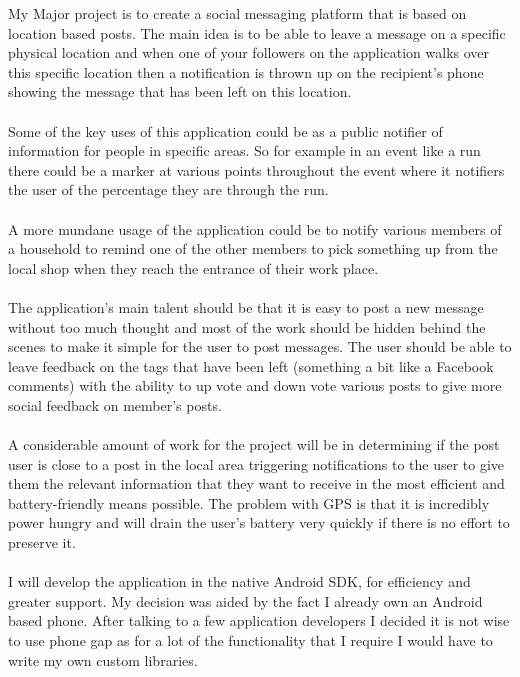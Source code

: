 \documentclass[11pt,fleqn,twoside]{article}
\begin{document}
My Major project is to create a social messaging platform that is based on location based posts. The main idea is to be able to leave a message on a specific physical location and when one of your followers on the application walks over this specific location then a notification is thrown up on the recipient's phone showing the message that has been left on this location. \\
\\
Some of the key uses of this application could be as a public notifier of information for people in specific areas. So for example in an event like a run there could be a marker at various points throughout the event where it notifiers the user of the percentage they are through the run. \\
\\
A more mundane usage of the application could be to notify various members of a household to remind one of the other members to pick something up from the local shop when they reach the entrance of their work place. \\
\\
The application's main talent should be that it is easy to post a new message without too much thought and most of the work should be hidden behind the scenes to make it simple for the user to post messages. The user should be able to leave feedback on the tags that have been left (something a bit like a Facebook comments) with the ability to up vote and down vote various posts to give more social feedback on member's posts.\\
\\
A considerable amount of work for the project will be in determining if the post user is close to a post in the local area triggering notifications to the user to give them the relevant information that they want to receive in the most efficient and battery-friendly means possible. The problem with GPS is that it is incredibly power hungry and will drain the user's battery very quickly if there is no effort to preserve it.\\
\\
I will develop the application in the native Android SDK, for efficiency and greater support. My decision was aided by the fact I already own an Android based phone. After talking to a few application developers I decided it is not wise to use phone gap as for a lot of the functionality that I require I would have to write my own custom libraries.

\end{document}
